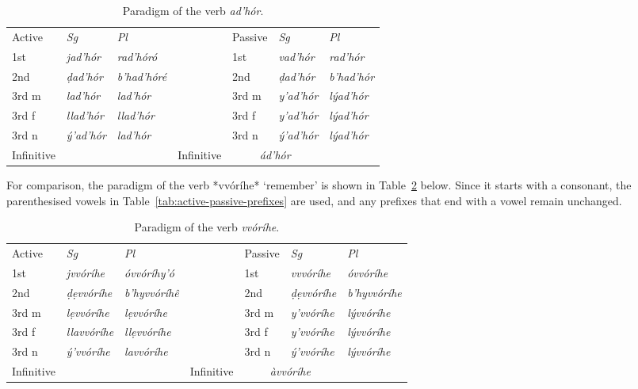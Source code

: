 \documentclass[a4paper, 12pt, oneside, final]{article}
\let \nf \normalfont
\def \d {ḍ}
\begin{document}
\begin{table}[h]
\centering
\noindent\begin{tabular}{@{}|>{}l|>{\it}l|>{\it}l|>{}l|>{}l|>{\it}l|>{\it}l|}\cline{1-3}\cline{5-7}
\nf Active&\nf Sg&\nf Pl&\nf &\nf Passive&\nf Sg&\nf Pl\\\cline{1-3}\cline{5-7}
1st&jad’hór&rad’hóró&&1st&vad’hór&rad’hór\\\cline{1-3}\cline{5-7}
2nd&\d{}ad’hór&b’had’hóré&&2nd&\d{}ad’hór&b’had’hór\\\cline{1-3}\cline{5-7}
3rd m&lad’hór&lad’hór&&3rd m&y’ad’hór&lýad’hór\\\cline{1-3}\cline{5-7}
3rd f&llad’hór&llad’hór&&3rd f&y’ad’hór &lýad’hór\\\cline{1-3}\cline{5-7}
3rd n&ý’ad’hór&lad’hór&&3rd n&ý’ad’hór&lýad’hór\\\cline{1-3}\cline{5-7}
Infinitive&\multicolumn{2}{c|}{\it dad’hór}&&Infinitive&\multicolumn{2}{c|}{\it ád’hór}\\\cline{1-3}\cline{5-7}
\end{tabular}
\caption{Paradigm of the verb \emph{ad’hór}.}\label{tab:adhor-paradigm}
\end{table}

\noindent For comparison, the paradigm of the verb *vvóríhe* ‘remember’ is shown in Table~\ref{tab:vvorihe-paradigm} below.
Since it starts with a consonant, the parenthesised vowels in Table~\ref{tab:active-passive-prefixes} are used, and any
prefixes that end with a vowel remain unchanged.

\begin{table}[h]
\centering
\noindent\begin{tabular}{@{}|>{}l|>{\it}l|>{\it}l|>{}l|>{}l|>{\it}l|>{\it}l|}\cline{1-3}\cline{5-7}
\nf Active&\nf Sg&\nf Pl&\nf &\nf Passive&\nf Sg&\nf Pl\\\cline{1-3}\cline{5-7}
1st&jvvóríhe&óvvóríhy’ó&&1st&vvvóríhe&óvvóríhe\\\cline{1-3}\cline{5-7}
2nd&ḍẹvvóríhe&b’hyvvóríhê&&2nd&ḍẹvvóríhe&b’hyvvóríhe\\\cline{1-3}\cline{5-7}
3rd m&lẹvvóríhe&lẹvvóríhe&&3rd m&y’vvóríhe&lývvóríhe\\\cline{1-3}\cline{5-7}
3rd f&llavvóríhe&llẹvvóríhe&&3rd f&y’vvóríhe&lývvóríhe\\\cline{1-3}\cline{5-7}
3rd n&ý’vvóríhe&lavvóríhe&&3rd n&ý’vvóríhe&lývvóríhe\\\cline{1-3}\cline{5-7}
Infinitive&\multicolumn{2}{c|}{\it dẹvvóríhe}&&Infinitive&\multicolumn{2}{c|}{\it àvvóríhe}\\\cline{1-3}\cline{5-7}
\end{tabular}
\caption{Paradigm of the verb \emph{vvóríhe}.}\label{tab:vvorihe-paradigm}
\end{table}
\end{document}
